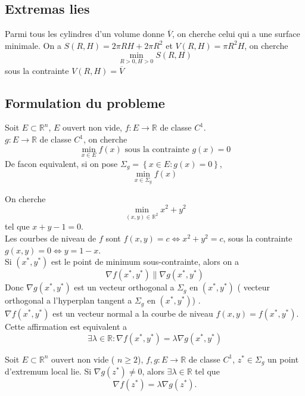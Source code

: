 \documentclass[../main.tex]{subfiles}
\begin{document}
\subsection{Extremas lies}
\begin{exemple}
Parmi tous les cylindres d'un volume donne $ \overline{V}$, on cherche celui qui a une surface minimale.
On a $S (R,H) = 2 \pi R H + 2 \pi R^{2} $ et $V( R,H) = \pi R^{2}H$, on cherche
\[ 
	\min_{R>0,H>0} S( R,H) 
\]
sous la contrainte $V( R,H) = \overline{V}$
\end{exemple}
\subsection*{Formulation du probleme}
Soit $E \subset \mathbb{R}^n$, $E$ ouvert non vide, $f: E \to \mathbb{R}$ de classe $C^{1}$.\\
$g:E \to \mathbb{R}$ de classe $C^{1}$, on cherche
\[ 
	\min_{x \in E} f( x)  \text{ sous la contrainte } g( x) =0
\]
De facon equivalent, si on pose $\Sigma_g = \left\{ x \in E : g( x) =0 \right\} $,
\[ 
	\min_{x \in \Sigma_g} f( x) 
\]
\begin{exemple}
On cherche
\[ 
	\min_{( x,y) \in \mathbb{R}^{2}} x^{2}+y^{2}
\]
tel que $x+y-1=0$.\\
Les courbes de niveau de $f$ sont $f( x,y) =c \iff x^{2}+ y^{2}=c$, sous la contrainte $g( x,y) =0 \iff y=1-x$.\\
Si $( x^{*},y^{*} )$ est le point de minimum sous-contrainte, alors on a
\[ 
	\nabla f ( x^{*},y^{*}) \parallel \nabla g( x^{*},y^{*}) 
\]
Donc $\nabla g ( x^{*},y^{*}) $ est un vecteur orthogonal a $\Sigma_g$ en $( x^{*},y^{*} )$ ( vecteur orthogonal a l'hyperplan tangent a $\Sigma_g$ en $( x^{*},y^{*}) $) .\\
$\nabla f( x^{*},y^{*}) $ est un vecteur normal a la courbe de niveau $f( x,y) = f( x^{*},y^{*}) $.\\
Cette affirmation est equivalent a 
\[ 
	\exists \lambda \in  \mathbb{R}: \nabla f( x^{*},y^{*}) = \lambda \nabla g( x^{*},y^{*}) 
\]


\end{exemple}
\begin{thm}
	Soit $E \subset \mathbb{R}^n$ ouvert non vide ( $n \geq 2$), $f,g : E \to \mathbb{R}$ de classe $C^{1}$, $z^{*} \in \Sigma_g$ un point d'extremum local lie. Si $\nabla g( z^{*}) \neq 0$, alors $\exists \lambda \in \mathbb{R}$ tel que 
	\[ 
		\nabla f( z^{*}) = \lambda \nabla g( z^{*}) .
	\]
\end{thm}
\end{document}

